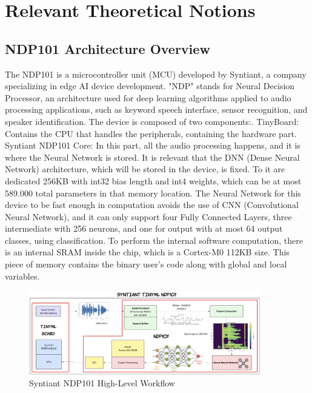 \chapter{Relevant Theoretical Notions}
\label{cha:background}

\section{NDP101 Architecture Overview}
\label{sec:architecture}
The NDP101 is a microcontroller unit (MCU) developed by Syntiant\cite{description_ndp101}, a company specializing in edge AI device development. "NDP" stands for Neural Decision Processor, an architecture used for deep learning algorithms applied to audio processing applications, such as keyword speech interface, sensor recognition, and speaker identification. The device is composed of two components:. TinyBoard: Contains the CPU that handles the peripherals, containing the hardware part. Syntiant NDP101 Core: In this part, all the audio processing happens, and it is where the Neural Network is stored. It is relevant that the DNN (Dense Neural Network) architecture, which will be stored in the device, is fixed. To it are dedicated 256KB with int32 bias length and int4 weights, which can be at most 589.000 total parameters in that memory location. The Neural Network for this device to be fast enough in computation avoids the use of CNN (Convolutional Neural Network), and it can only support four Fully Connected Layers, three intermediate with 256 neurons, and one for output with at most 64 output classes, using classification. To perform the internal software computation, there is an internal SRAM inside the chip, which is a Cortex-M0 112KB size. This piece of memory contains the binary user's code along with global and local variables.
\begin{figure}[!h]
    \centering
        \includegraphics[width=0.9\textwidth]{images/2.01 NDP101 High Level Workflow.png}
        \caption{Syntiant NDP101 High-Level Workflow}
\end{figure}
